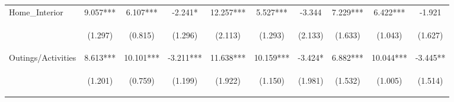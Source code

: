 \begin{tabular}{lccccccccc}
\noalign{\smallskip}Home_Interior & 9.057*** & 6.107*** & -2.241* & 12.257*** & 5.527*** & -3.344 & 7.229*** & 6.422*** & -1.921\\
 & \begin{footnotesize}(1.297)\end{footnotesize} & \begin{footnotesize}(0.815)\end{footnotesize} & \begin{footnotesize}(1.296)\end{footnotesize} & \begin{footnotesize}(2.113)\end{footnotesize} & \begin{footnotesize}(1.293)\end{footnotesize} & \begin{footnotesize}(2.133)\end{footnotesize} & \begin{footnotesize}(1.633)\end{footnotesize} & \begin{footnotesize}(1.043)\end{footnotesize} & \begin{footnotesize}(1.627)\end{footnotesize}\\
\noalign{\smallskip}Outings/Activities & 8.613*** & 10.101*** & -3.211*** & 11.638*** & 10.159*** & -3.424* & 6.882*** & 10.044*** & -3.445**\\
 & \begin{footnotesize}(1.201)\end{footnotesize} & \begin{footnotesize}(0.759)\end{footnotesize} & \begin{footnotesize}(1.199)\end{footnotesize} & \begin{footnotesize}(1.922)\end{footnotesize} & \begin{footnotesize}(1.150)\end{footnotesize} & \begin{footnotesize}(1.981)\end{footnotesize} & \begin{footnotesize}(1.532)\end{footnotesize} & \begin{footnotesize}(1.005)\end{footnotesize} & \begin{footnotesize}(1.514)\end{footnotesize}\\

\end{tabular}
